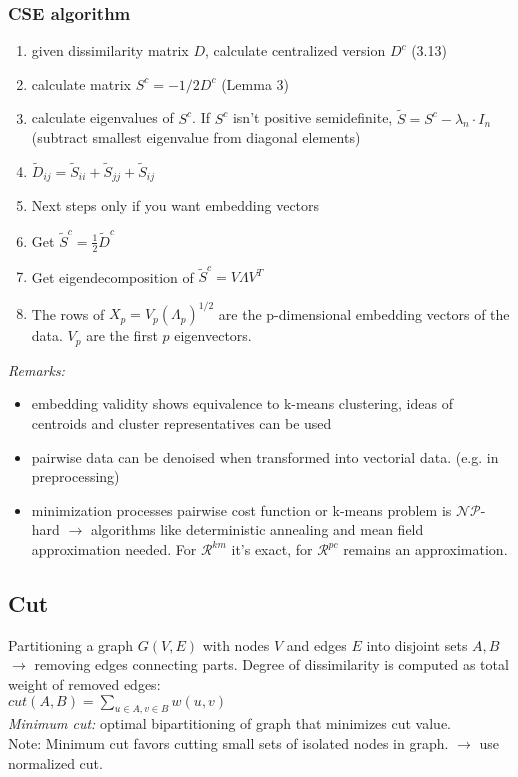 \documentclass[9pt,parskip]{scrartcl}
\begin{document}
\begin{multicols*}{4}
\subsubsection*{CSE algorithm}
\begin{enumerate}
	\item given dissimilarity matrix $D$, calculate centralized version $D^c$ (3.13)
	\item calculate matrix $S^c = - 1/2 D^c$ (Lemma 3)
	\item calculate eigenvalues of $S^c$. If $S^c$ isn't positive semidefinite, $\tilde{S} = S^c - \lambda_n \cdot I_n$ (subtract smallest eigenvalue from diagonal elements)
	\item  $\tilde{D}_{ij} =  \tilde{S}_{ii} +   \tilde{S}_{jj} + \tilde{S}_{ij} $
	\item Next steps only if you want embedding vectors
	\item Get $\tilde{S}^c = \frac{1}{2}\tilde{D}^c$
	\item Get eigendecomposition of $\tilde{S}^c = V\Lambda V^T$
	\item The rows of $X_p = V_p (\Lambda_p)^{1/2}$ are the p-dimensional embedding vectors of the data. $V_p$ are the first $p$ eigenvectors.
\end{enumerate}

\textit{Remarks:}
\begin{itemize}
	\item embedding validity shows equivalence to k-means clustering, ideas of centroids and cluster representatives can be used
	\item pairwise data can be denoised when transformed into vectorial data. (e.g. in preprocessing)
	\item minimization processes pairwise cost function or k-means problem is $\mathcal{N}\mathcal{P}$-hard $\to$ algorithms like deterministic annealing and mean field approximation needed. For $\mathcal{R}^{km}$ it's exact, for $\mathcal{R}^{pc}$ remains an approximation.
\end{itemize}

\subsection*{Cut}
Partitioning a graph $G(V,E)$ with nodes $V$ and edges $E$ into disjoint sets $A,B$ $\to$ removing edges connecting parts. Degree of dissimilarity is computed as total weight of removed edges: \\
$cut(A,B) = \sum_{u \in A, v \in B} w(u,v)$ \\
\textit{Minimum cut: } optimal bipartitioning of graph that minimizes cut value. \\
Note: Minimum cut favors cutting small sets of isolated nodes in graph. $\to $ use normalized cut.

\end{multicols*}
\end{document}
